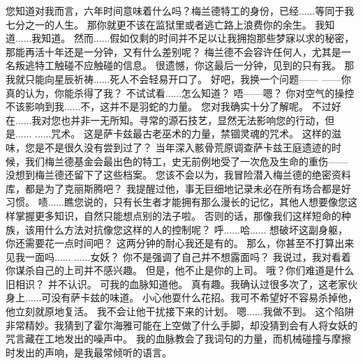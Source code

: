 \documentclass[openany]{book}
\begin{document}
\begin{dialogue}
     您知道对我而言，六年时间意味着什么吗？梅兰德特工的身份，已经......等同于我七分之一的人生。
     那你就更不该在监狱里或者逃亡路上浪费你的余生。
     我知道......我知道。
     然而......假如仅剩的时间并不足以让我拥抱那些梦寐以求的秘密，那能再活十年还是一分钟，又有什么差别呢？
     梅兰德不会容许任何人，尤其是一名叛逃特工触碰不应触碰的信息。
     很遗憾，你这最后一分钟，见到的只有我。
     那我就只能向星辰祈祷......死人不会轻易开口了。
     好吧，我换一个问题——
     ——你真的认为，你能杀得了我？
     不试试看......怎么知道？
     唔——嗯？
     你对空气的操控不该影响到我......不，这并不是羽蛇的力量。
     您对我确实十分了解呢。
     不过好在......我对您也并非一无所知。寻常的源石技艺，显然无法影响您的行动，但是......
     ......咒术。
     这是萨卡兹最古老巫术的力量，禁锢灵魂的咒术。
     这样的滋味，您是不是很久没有尝到过了？
     当年深入骸骨荒原调查萨卡兹王庭遗迹的时候，我们梅兰德基金会最出色的特工，史无前例地受了一次危及生命的重伤——
     没想到梅兰德还留下了这些档案。
     您该不会以为，我冒险潜入梅兰德的绝密资料库，都是为了克丽斯腾吧？
     我提醒过他，事无巨细地记录未必在所有场合都是好习惯。
     啧......瞧您说的，只有长生者才能拥有那么漫长的记忆，其他人想要像您这样掌握更多知识，自然只能想点别的法子啦。
     否则的话，那像我们这样短命的种族，该用什么方法对抗像您这样的人的控制呢？
     呼......哈......
     想破坏这副身躯，你还需要花一点时间吧？
     这两分钟的耐心我还是有的。
     那么，你甚至不打算出来见我一面吗......
     ......女妖？
     你不是强调了自己并不想露面吗？
     我说过，我对看着你谋杀自己的上司并不感兴趣。
     但是，他不止是你的上司。
     哦？你们难道是什么旧相识？
     并不认识。
     可我的血脉知道他。
     真有趣。我确认过很多次了，这老家伙身上......可没有萨卡兹的味道。
     小心他耍什么花招。我可不希望好不容易杀掉他，他立刻就原地复活。
     我不会让他干扰接下来的计划。
     嗯......我做不到。
     这个陷阱非常精妙。我猜到了霍尔海雅可能在上空做了什么手脚，却没猜到会有人将女妖的咒言藏在工地发出的噪声中。
     我的血脉教会了我词句的力量，而机械碰撞与摩擦时发出的声响，是我最常倾听的语言。

\end{dialogue}
\end{document}
